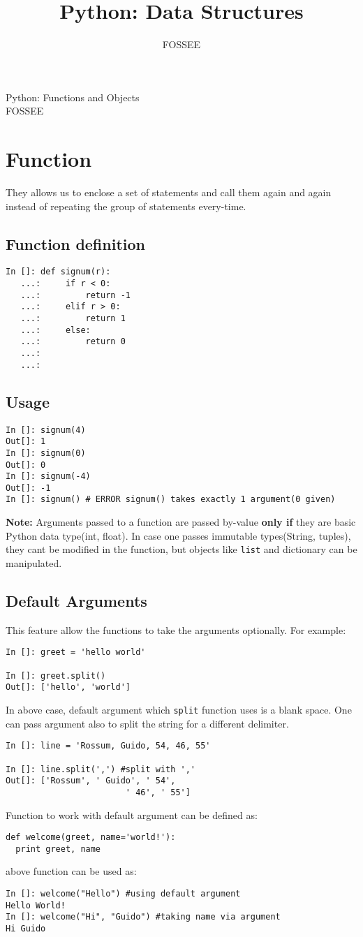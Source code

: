 \documentclass[12pt]{article}
\title{Python: Data Structures}
\author{FOSSEE}
\newcommand{\typ}[1]{\lstinline{#1}}
\begin{document}
\date{}
\vspace{-1in}
\begin{center}
\LARGE{Python: Functions and Objects}\\
\large{FOSSEE}
\end{center}
\section{Function}
They allows us to enclose a set of statements and call them again and again instead of repeating the group of statements every-time. 
\subsection{Function definition}
  \begin{lstlisting}
In []: def signum(r):
   ...:     if r < 0:
   ...:         return -1
   ...:     elif r > 0:
   ...:         return 1
   ...:     else:
   ...:         return 0
   ...:     
   ...:
  \end{lstlisting}
\subsection{Usage}
\begin{lstlisting}
In []: signum(4)
Out[]: 1
In []: signum(0)
Out[]: 0
In []: signum(-4)
Out[]: -1
In []: signum() # ERROR signum() takes exactly 1 argument(0 given)
\end{lstlisting}
\textbf{Note:} Arguments passed to a function are passed by-value \textbf{only if} they are basic Python data type(int, float). In case one passes immutable types(String, tuples), they cant be modified in the function, but objects like \typ{list} and dictionary can be manipulated.
\subsection{Default Arguments}
This feature allow the functions to take the arguments optionally. For example:
\begin{lstlisting}
In []: greet = 'hello world'

In []: greet.split()
Out[]: ['hello', 'world']
\end{lstlisting}
In above case, default argument which \typ{split} function uses is a blank space. One can pass argument also to split the string for a different delimiter.
\begin{lstlisting}
In []: line = 'Rossum, Guido, 54, 46, 55'

In []: line.split(',') #split with ','
Out[]: ['Rossum', ' Guido', ' 54',
                        ' 46', ' 55']
\end{lstlisting}
Function to work with default argument can be defined as:
\begin{lstlisting}
def welcome(greet, name='world!'):
  print greet, name
\end{lstlisting}
above function can be used as:
\begin{lstlisting}
In []: welcome("Hello") #using default argument
Hello World!
In []: welcome("Hi", "Guido") #taking name via argument
Hi Guido
\end{lstlisting}
\end{document}
